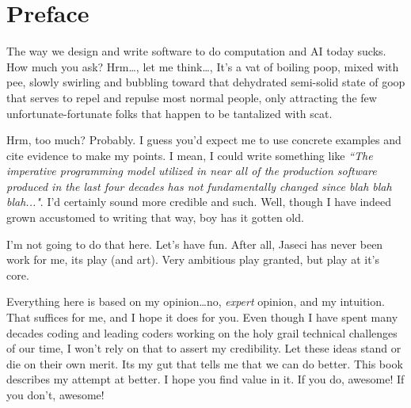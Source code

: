 \chapter*{Preface}

The way we design and write software to do computation and AI today sucks. How much you ask? Hrm\dots, let me think\dots, It's a vat of boiling poop, mixed with pee, slowly swirling and bubbling toward that dehydrated semi-solid state of goop that serves to repel and repulse most normal people, only attracting the few unfortunate-fortunate folks that happen to be tantalized with \gls{scat}.
\par
Hrm, too much? Probably. I guess you'd expect me to use concrete examples and cite evidence to make my points. I mean, I could write something like \textit{``The imperative programming model utilized in near all of the production software produced in the last four decades has not fundamentally changed since blah blah blah..."}. I'd certainly sound more credible and such. Well, though I have indeed grown accustomed to writing that way, boy has it gotten old.
\par
I'm not going to do that here. Let's have fun. After all, Jaseci has never been work for me, its play (and art). Very ambitious play granted, but play at it's core.
\par
Everything here is based on my opinion\dots no, \emph{expert} opinion, and my intuition. That suffices for me, and I hope it does for you. Even though I have spent many decades coding and leading coders working on the holy grail technical challenges of our time, I won't rely on that to assert my credibility. Let these ideas stand or die on their own merit. Its my gut that tells me that we can do better. This book describes my attempt at better. I hope you find value in it. If you do, awesome! If you don't, awesome!
